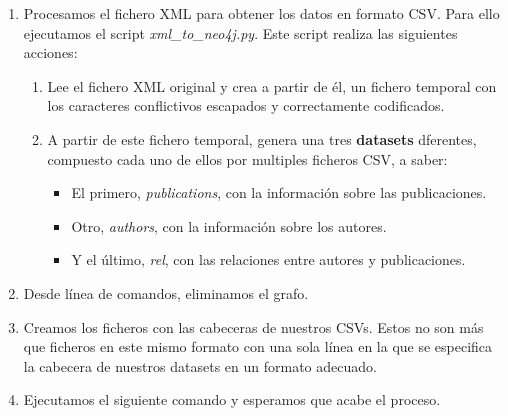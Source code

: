 \begin{enumerate}
 \item Procesamos el fichero \gls{XML} para obtener los datos en formato \gls{CSV}. Para ello ejecutamos el script \textit{xml\_to\_neo4j.py}. Este script realiza las siguientes acciones:
 \begin{enumerate}
  \item Lee el fichero \gls{XML} original y crea a partir de él, un fichero temporal con los caracteres conflictivos escapados y correctamente codificados.
  \item A partir de este fichero temporal, genera una tres \textbf{datasets} dferentes, compuesto cada uno de ellos por multiples ficheros \gls{CSV}, a saber:
  \begin{itemize}
   \item El primero, \textit{publications}, con la información sobre las publicaciones.
   \item Otro, \textit{authors}, con la información sobre los autores.
   \item Y el último, \textit{rel}, con las relaciones entre autores y publicaciones.
  \end{itemize}
 \end{enumerate}
 \item Desde línea de comandos, eliminamos el grafo.
 \item Creamos los ficheros con las cabeceras de nuestros \glspl{CSV}. Estos no son más que ficheros en este mismo formato con una sola línea en la que se especifica la cabecera de nuestros datasets en un formato adecuado.
 \item Ejecutamos el siguiente comando y esperamos que acabe el proceso.
\end{enumerate}




